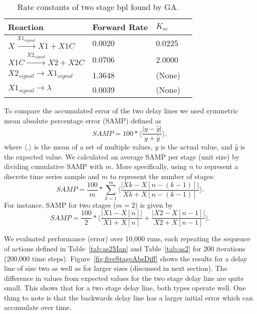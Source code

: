 \begin{table}
    \caption[Two Stage Backwards Propagating Delay Line Rate Constants]{Rate constants of two stage \gls{bpl} found by GA.}
    \label{tab:rateconstants}
    \centering
    \begin{tabular}{llll}
	    Reaction                                 & Forward Rate & $K_m$          \\ \hline
	    $X \xrightarrow{X1_{signal}} X1 + X1C$   & 0.0020       & 0.0225         \\
	    $X1C \xrightarrow{X2_{signal}} X2 + X2C$ & 0.0706       & 2.0000         \\
	    $X2_{signal} \rightarrow X1_{signal}$    & 1.3648       & (None)         \\
	    $X1_{signal} \rightarrow \lambda$        & 0.0039       & (None)         \\
    \end{tabular}
\end{table}

To compare the accumulated error of the two delay lines we used symmetric mean absolute percentage error (SAMP) defined as
\begin{equation}
SAMP = 100 * \langle \frac{|y-\hat{y}|}{y+\hat{y}} \rangle,
\end{equation}
where $\langle.\rangle$ is the mean of a set of multiple values, $y$ is the actual value, and $\hat{y}$ is the expected value. We calculated an average SAMP per stage (unit size) by dividing cumulative SAMP with $m$. More specifically, using $n$ to represent a discrete time series sample and $m$ to represent the number of stages:
\begin{equation}
SAMP = \frac{100}{m} * \sum \limits_{k=1}^{m} \langle \frac{|Xk-X[n-(k-1)]|}{Xk+X[n-(k-1)]} \rangle.
\end{equation}
For instance, SAMP for two stages ($m=2$) is given by
\begin{equation}
SAMP = \frac{100}{2} * \langle \frac{|X1-X[n]|}{X1+X[n]} + \frac{|X2-X[n-1]|}{X2+X[n-1]} \rangle \label{eq:sampn2}.
\end{equation}

We evaluated performance (error) over 10,000 runs, each repeating the sequence of actions defined in Table~\ref{tab:as2Man} and Table~\ref{tab:as2} for 200 iterations (200,000 time steps). Figure~\ref{fig:fiveStageAbsDiff} shows the results for a delay line of size two as well as for larger sizes (discussed in next section). The difference in values from expected values for the two stage delay line are quite small. This shows that for a two stage delay line, both types operate well. One thing to note is that the backwards delay line has a larger initial error which can accumulate over time.

